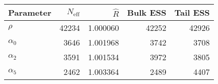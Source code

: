 \begin{table}[!h]
\centering
\begin{tabular}{>{\raggedright\arraybackslash}p{2cm}rrrr}
\toprule
Parameter & $N_{\text{eff}}$ & $\widehat{R}$ & Bulk ESS & Tail ESS\\
\midrule
\rowcolor{gray!6}  $\rho$ & 42234 & 1.000060 & 42252 & 42926\\
$\alpha_{0}$ & 3646 & 1.001968 & 3742 & 3708\\
\rowcolor{gray!6}  $\alpha_{2}$ & 3591 & 1.001534 & 3972 & 3805\\
$\alpha_{5}$ & 2462 & 1.003364 & 2489 & 4407\\
\bottomrule
\end{tabular}
\end{table}